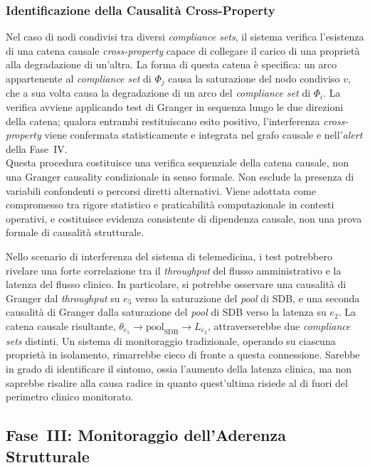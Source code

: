 \subsubsection{Identificazione della Causalità Cross-Property}
\label{sec:causalita_cross_property}

Nel caso di nodi condivisi tra diversi \textit{compliance sets}, il sistema verifica l'esistenza di
una catena causale \textit{cross-property} capace di collegare il carico di una proprietà alla
degradazione di un'altra. La forma di questa catena è specifica: un arco appartenente al
\textit{compliance set} di $\Phi_j$ causa la saturazione del nodo condiviso $v$, che a sua volta
causa la degradazione di un arco del \textit{compliance set} di $\Phi_i$. La verifica avviene
applicando test di Granger in sequenza lungo le due direzioni della catena; qualora entrambi
restituiscano esito positivo, l'interferenza \textit{cross-property} viene confermata statistica\-mente
e integrata nel grafo causale e nell'\textit{alert} della Fase~IV. \\
Questa procedura costituisce una verifica sequenziale della catena causale, non una Granger
causality condizionale in senso formale. Non esclude la presenza di variabili confondenti o percorsi
diretti alternativi. Viene adottata come compromesso tra rigore statistico e praticabilità
computazionale in contesti operativi, e costituisce evidenza consistente di dipendenza causale, non
una prova formale di causalità strutturale.

Nello scenario di interferenza del sistema di telemedicina, i test potrebbero rivelare una forte
correlazione tra il \textit{throughput} del flusso amministrativo e la latenza del flusso clinico.
In particolare, si potrebbe osservare una causalità di Granger dal \textit{throughput} su $e_5$
verso la saturazione del \textit{pool} di SDB, e una seconda causalità di Granger dalla saturazione
del \textit{pool} di SDB verso la latenza su $e_2$. La catena causale risultante,
$\theta_{e_5} \to \text{pool}_{\text{SDB}} \to L_{e_2}$, attraverserebbe due \textit{compliance
sets} distinti. Un sistema di monitoraggio tradizionale, operando su ciascuna proprietà in
isolamento, rimarrebbe cieco di fronte a questa connessione. Sarebbe in grado di identificare il
sintomo, ossia l'aumento della latenza clinica, ma non saprebbe risalire alla causa radice in
quanto quest'ultima risiede al di fuori del perimetro clinico monitorato.

\subsection{Fase~III: Monitoraggio dell'Aderenza Strutturale}
\label{sec:fase_3}

